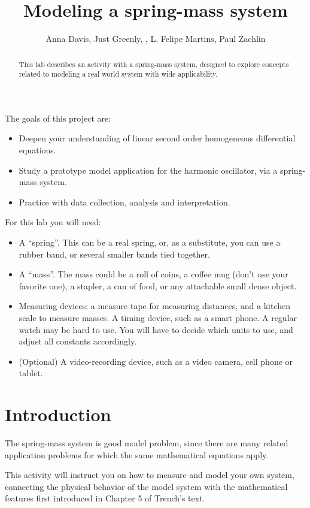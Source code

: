 \documentclass{ximera}
\title{Modeling a spring-mass system}
\author{Anna Davis, Just Greenly, , L. Felipe Martins, Paul Zachlin}
\begin{document}
\begin{abstract}
This lab describes an activity with a spring-mass system, designed to explore concepts related to modeling a real world system with wide applicability.
\end{abstract}

\maketitle

The goals of this project are:
\begin{itemize}
    \item Deepen your understanding of linear second order homogeneous differential equations.
    \item Study a prototype model application for the harmonic oscillator, via a spring-mass system.
    \item Practice with data collection, analysis and interpretation.
\end{itemize}

For this lab you will need:
\begin{itemize}
    \item A ``spring''. This can be a real spring, or, as a substitute, you can use a rubber band, or several smaller bands tied together.
    \item A ``mass''. The mass could be a roll of coins, a coffee mug (don’t use your favorite one), a stapler, a can of food, or any attachable small dense object.
    \item Measuring devices: a measure tape for measuring distances, and a kitchen scale to measure masses. A timing device, such as a smart phone. A regular watch may be hard to use. You will have to decide which units to use, and adjust all constants accordingly.
    \item (Optional) A video-recording device, such as a video camera, cell phone or tablet.
\end{itemize}

\section{Introduction}

The spring-mass system is good model problem, since there are many related application problems for which the same mathematical equations apply.  

This activity will instruct you on how to measure and model your own system, connecting the physical behavior of the model system with the mathematical features first introduced in Chapter 5 of Trench’s text.
\end{document}
